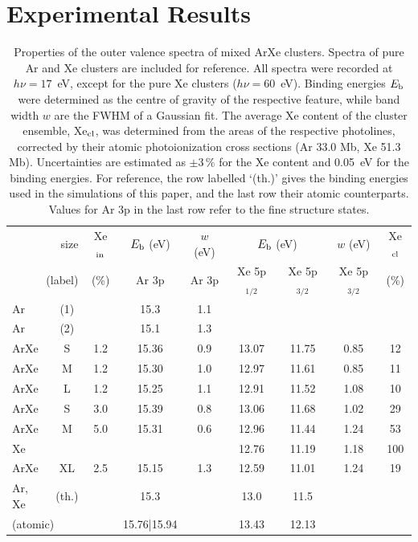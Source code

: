 \section{Experimental Results
\label{sec:exp_results}}
%
%
\begin{table}
\caption{Properties of the outer valence spectra of mixed ArXe clusters. 
Spectra of pure Ar and Xe clusters are included for reference. 
All spectra were recorded at $h\nu = 17$~eV, except for the pure Xe clusters ($h\nu = 60$~eV). 
Binding energies $E_{\rm b}$ were determined as the centre of gravity of the respective feature, while band width $w$ are the FWHM of a Gaussian fit. 
The average Xe content of the cluster ensemble, Xe$_{\rm cl}$, was determined from the areas of the respective photolines, corrected by their atomic photoionization cross sections (Ar 33.0 Mb, Xe 51.3 Mb)\cite{samson2002}.
Uncertainties are estimated as $\pm$3\,\% for the Xe content and 0.05~eV for the binding energies. 
For reference, the row labelled `(th.)' gives the binding energies used in the simulations of this paper, and the last row their atomic counterparts. 
Values for Ar 3p in the last row refer to the fine structure states.
\label{tab:valence} }
\begin{tabular}{ l c c c c c c c c}
%
\toprule
 \multicolumn{2}{r}{size} &  Xe$_{\rm in}$& $E_{\rm b}$ (eV)& $w$ (eV)& \multicolumn{2}{c}{$E_{\rm b}$ (eV)}  & $w$ (eV) &  Xe$_{\rm cl}$ \\
%
 \multicolumn{2}{r}{(label)}&  (\%) & Ar 3p & Ar 3p & Xe 5p$_{1/2}$ &  Xe 5p$_{3/2}$ & Xe 5p$_{3/2}$  &  (\%) \\
\midrule
 Ar & (1) &&  15.3  &  1.1 & & & &  \\
 Ar & (2) &&  15.1  &  1.3 & & & &  \\
%
 ArXe & S &1.2 & 15.36 & 0.9 & 13.07 & 11.75 & 0.85 & 12\\
 ArXe & M &1.2 & 15.30 & 1.0 & 12.97 & 11.61 & 0.85 & 11\\
 ArXe & L &1.2 & 15.25 & 1.1 & 12.91 & 11.52 & 1.08 & 10\\
 ArXe & S &3.0 & 15.39 & 0.8 & 13.06 & 11.68 & 1.02 & 29\\
 ArXe & M &5.0 & 15.31 & 0.6 & 12.96 & 11.44 & 1.24 & 53\\
 Xe &  & & & & 12.76 & 11.19 & 1.18 & 100\\
%
\midrule
%
 ArXe & XL &2.5 & 15.15 & 1.3 & 12.59 & 11.01 & 1.24 & 19\\
%
\midrule
 Ar, Xe & (th.) && 15.3 && 13.0 & 11.5 &&\\
%
 \multicolumn{2}{l}{(atomic)\cite{velchev,sansonetti}} && 15.76|15.94 && 13.43 & 12.13 &&\\
%
\bottomrule
\end{tabular}
\end{table}

